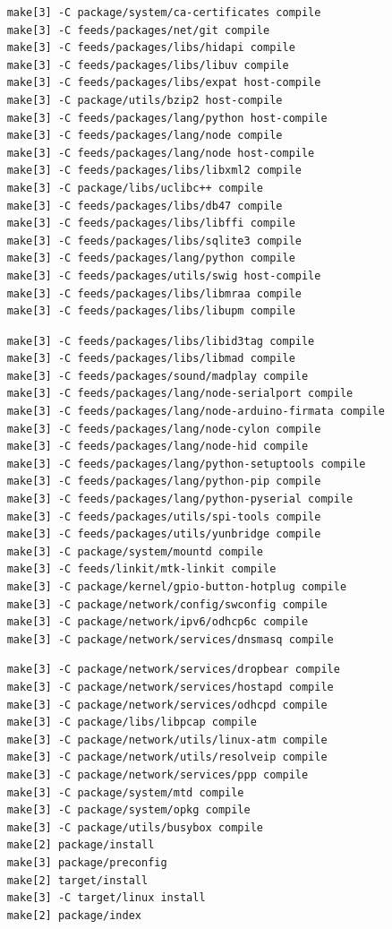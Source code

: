 \documentclass{beamer}
\begin{document}
\begin{frame}[fragile]
  \begin{lstlisting}
    make[3] -C package/system/ca-certificates compile
    make[3] -C feeds/packages/net/git compile
    make[3] -C feeds/packages/libs/hidapi compile
    make[3] -C feeds/packages/libs/libuv compile
    make[3] -C feeds/packages/libs/expat host-compile
    make[3] -C package/utils/bzip2 host-compile
    make[3] -C feeds/packages/lang/python host-compile
    make[3] -C feeds/packages/lang/node compile
    make[3] -C feeds/packages/lang/node host-compile
    make[3] -C feeds/packages/libs/libxml2 compile
    make[3] -C package/libs/uclibc++ compile
    make[3] -C feeds/packages/libs/db47 compile
    make[3] -C feeds/packages/libs/libffi compile
    make[3] -C feeds/packages/libs/sqlite3 compile
    make[3] -C feeds/packages/lang/python compile
    make[3] -C feeds/packages/utils/swig host-compile
    make[3] -C feeds/packages/libs/libmraa compile
    make[3] -C feeds/packages/libs/libupm compile
  \end{lstlisting}
\end{frame}

\begin{frame}[fragile]
  \begin{lstlisting}
    make[3] -C feeds/packages/libs/libid3tag compile
    make[3] -C feeds/packages/libs/libmad compile
    make[3] -C feeds/packages/sound/madplay compile
    make[3] -C feeds/packages/lang/node-serialport compile
    make[3] -C feeds/packages/lang/node-arduino-firmata compile
    make[3] -C feeds/packages/lang/node-cylon compile
    make[3] -C feeds/packages/lang/node-hid compile
    make[3] -C feeds/packages/lang/python-setuptools compile
    make[3] -C feeds/packages/lang/python-pip compile
    make[3] -C feeds/packages/lang/python-pyserial compile
    make[3] -C feeds/packages/utils/spi-tools compile
    make[3] -C feeds/packages/utils/yunbridge compile
    make[3] -C package/system/mountd compile
    make[3] -C feeds/linkit/mtk-linkit compile
    make[3] -C package/kernel/gpio-button-hotplug compile
    make[3] -C package/network/config/swconfig compile
    make[3] -C package/network/ipv6/odhcp6c compile
    make[3] -C package/network/services/dnsmasq compile
  \end{lstlisting}
\end{frame}

\begin{frame}[fragile]
  \begin{lstlisting}
    make[3] -C package/network/services/dropbear compile
    make[3] -C package/network/services/hostapd compile
    make[3] -C package/network/services/odhcpd compile
    make[3] -C package/libs/libpcap compile
    make[3] -C package/network/utils/linux-atm compile
    make[3] -C package/network/utils/resolveip compile
    make[3] -C package/network/services/ppp compile
    make[3] -C package/system/mtd compile
    make[3] -C package/system/opkg compile
    make[3] -C package/utils/busybox compile
    make[2] package/install
    make[3] package/preconfig
    make[2] target/install
    make[3] -C target/linux install
    make[2] package/index
  \end{lstlisting}
\end{frame}
\end{document}
